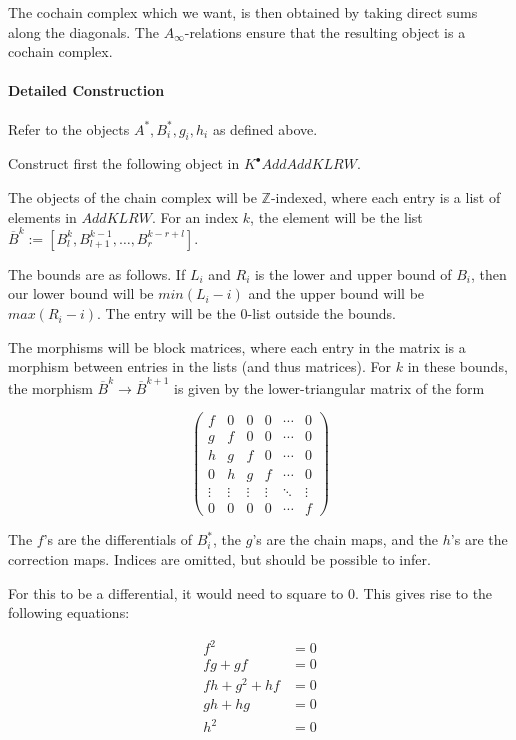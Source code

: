 The cochain complex which we want, is then obtained by taking direct sums along the diagonals. The $A_\infty$-relations ensure that the resulting object is a cochain complex.

\paragraph{Detailed Construction}
Refer to the objects $A^*, B_i^*, g_i, h_i$ as defined above.

Construct first the following object in $K^\bullet AddAddKLRW$.

The objects of the chain complex will be $\mathbb{Z}$-indexed, where each entry is a list of elements in $AddKLRW$. For an index $k$, the element will be the list $\overline{B}^k:=[B_l ^k, B_{l+1}^{k-1},\dots ,B_r ^{k-r+l}]$.

The bounds are as follows. If $L_i$ and $R_i$ is the lower and upper bound of $B_i$, then our lower bound will be $min(L_i-i)$ and the upper bound will be $max(R_i-i)$. The entry will be the $0$-list outside the bounds.

The morphisms will be block matrices, where each entry in the matrix is a morphism between entries in the lists (and thus matrices). For $k$ in these bounds, the morphism $\overline{B}^k\to \overline{B}^{k+1}$ is given by the lower-triangular matrix of the form


\[
\begin{pmatrix}
f & 0 & 0 & 0 & \cdots & 0 \\
g & f & 0 & 0 & \cdots & 0 \\
h & g & f & 0 & \cdots & 0 \\
0 & h & g & f & \cdots & 0 \\
\vdots & \vdots & \vdots & \vdots & \ddots & \vdots \\
0 & 0 & 0 & 0 & \cdots & f
\end{pmatrix}
\]

The $f$'s are the differentials of $B^*_i$, the $g$'s are the chain maps, and the $h$'s are the correction maps. Indices are omitted, but should be possible to infer.

For this to be a differential, it would need to square to 0. This gives rise to the following equations:

\begin{align}
f^2 &= 0 \label{eq:f-squared}\\
fg + gf &= 0 \label{eq:anticomm-fg}\\
fh + g^2 + hf &= 0 \label{eq:cross-term}\\
gh + hg &= 0 \label{eq:anticomm-gh}\\
h^2 &= 0 \label{eq:h-squared}
\end{align}

